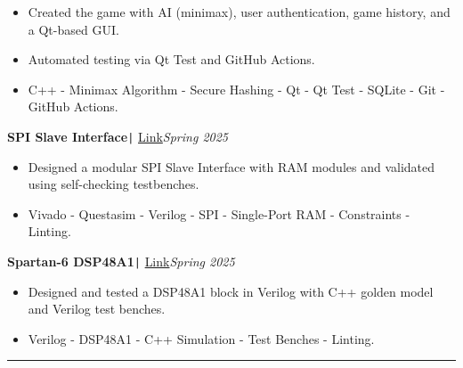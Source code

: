 \documentclass[11pt,a4paper]{article}
\begin{document}
\vspace{-0.6cm}
\begin{itemize}
\item \setlength{\itemsep}{-0.0em} Created the game with AI (minimax), user authentication, game history, and a Qt-based GUI.
\item \setlength{\itemsep}{-0.0em} Automated testing via Qt Test and GitHub Actions.
\item \setlength{\itemsep}{-0.0em} C++ - Minimax Algorithm - Secure Hashing - Qt - Qt Test - SQLite - Git - GitHub Actions.
\end{itemize}
\vspace{-0.3cm}
\newpage
\begin{flushleft}
\textbf{SPI Slave Interface}\texttt{|} {\href{https://github.com/salah0eldin/Digital-Projects/tree/master/SPI_Slave_Interface}{Link}}\hfill\textit{Spring 2025}\\
\end{flushleft}
\vspace{-0.6cm}
\begin{itemize}
\item \setlength{\itemsep}{-0.0em} Designed a modular SPI Slave Interface with RAM modules and validated using self-checking testbenches.
\item \setlength{\itemsep}{-0.0em} Vivado - Questasim - Verilog - SPI - Single-Port RAM - Constraints - Linting.
\end{itemize}
\vspace{-0.3cm}
\begin{flushleft}
\textbf{Spartan-6 DSP48A1}\texttt{|} {\href{https://github.com/salah0eldin/Digital-Projects/tree/master/DSP48A1}{Link}}\hfill\textit{Spring 2025}\\
\end{flushleft}
\vspace{-0.6cm}
\begin{itemize}
\item \setlength{\itemsep}{-0.0em} Designed and tested a DSP48A1 block in Verilog with C++ golden model and Verilog test benches.
\item \setlength{\itemsep}{-0.0em} Verilog - DSP48A1 - C++ Simulation - Test Benches - Linting.
\end{itemize}
\vspace{-0.3cm}
\vspace{-0.2cm}
\rule{\textwidth}{0.3pt}\\
\vspace{-0.5cm}
\centering
\end{document}
